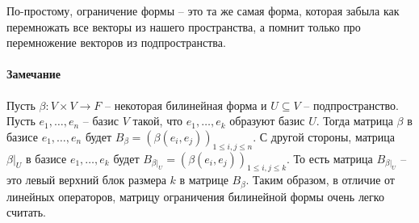По-простому, ограничение формы -- это та же самая форма, которая забыла как перемножать все векторы из нашего пространства, а помнит только про перемножение векторов из подпространства.


\paragraph{Замечание}

Пусть $\beta\colon V\times V\to F$ -- некоторая билинейная форма и $U\subseteq V$ -- подпространство.
Пусть $e_1,\ldots,e_n$ -- базис $V$ такой, что $e_1,\ldots,e_k$ образуют базис $U$.
Тогда матрица $\beta$ в базисе $e_1,\ldots,e_n$ будет $B_{\beta} = (\beta(e_i, e_j))_{1\leqslant i,j \leqslant n}$.
С другой стороны, матрица $\beta|_U$ в базисе $e_1,\ldots,e_k$ будет $B_{\beta|_U} = (\beta(e_i, e_j))_{1\leqslant i,j \leqslant k}$.
То есть матрица $B_{\beta|_U}$ -- это левый верхний блок размера $k$ в матрице $B_{\beta}$.
Таким образом, в отличие от линейных операторов, матрицу ограничения  билинейной формы очень легко считать.

